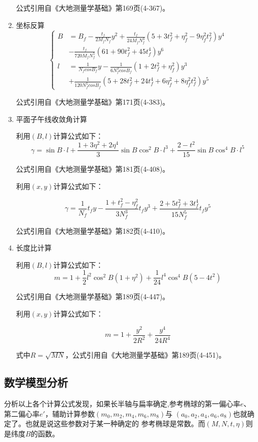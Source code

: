 \begin{enumerate}
公式引用自《大地测量学基础》第169页(4-367)。

\item 坐标反算
\[
\left \{ \begin{aligned}
B&=B_f - \frac{t_f}{2M_f N_f }y^2 +\frac{t_f}{24 M_f N_f ^3}
(5 + 3t_f ^2  + \eta_f ^2 - 9\eta_f ^2 t_f^2)y^4 \\
 &- \frac{t_f}{720 M_f N_f ^5}(61 + 90t_f ^2 + 45t_f ^4)y^6 \\
l&=\frac{1}{N_f cosB_f}y - \frac{1}{6N_f ^3 cosB_f}(1 + 2t_f ^2 + \eta_f ^2)y^3  \\
 &+ \frac{1}{120N_f ^5 cosB_f}(5 + 28t_f ^2 + 24t_f ^4 + 6\eta_f ^2 +8\eta_f ^2 t_f ^2)y^5
\end{aligned} \right.
\]

公式引用自《大地测量学基础》第171页(4-383)。


\item 平面子午线收敛角计算

利用$(B, l)$计算公式如下：
$$\gamma = \sin B \cdot l + \frac{1 + 3 \eta^2 + 2 \eta^4}{3} \sin B \cos ^2 B \cdot l^3 
+ \frac{2 - t^2}{15}\sin B \cos ^4 B \cdot l^5$$

公式引用自《大地测量学基础》第181页(4-408)。

利用$(x, y)$计算公式如下：

$$\gamma = \frac{1}{N_f}t_f y - \frac{1+t_f ^2 - \eta_f ^2}{3N_f ^3}t_f y^3 
+ \frac{2+5t_f^2+3t_f^4}{15N_f ^5}t_fy^5$$

公式引用自《大地测量学基础》第182页(4-410)。

\item 长度比计算

利用$(B, l)$计算公式如下：
$$m=1+\frac{1}{2}l^2 \cos ^2 B(1+\eta^2) + \frac{1}{24}l^4\cos ^4 B(5-4t^2)$$

公式引用自《大地测量学基础》第189页(4-447)。

利用$(x, y)$计算公式如下：

$$m=1+\frac{y^2}{2R^2} + \frac{y^4}{24R^4}$$

式中$R=\sqrt{MN}$，公式引用自《大地测量学基础》第189页(4-451)。

\end{enumerate}

\subsection{数学模型分析}
分析以上各个计算公式发现，如果长半轴与扁率确定,参考椭球的第一偏心率$e$、
第二偏心率$e'$，辅助计算参数$(m_0, m_2, m_4, m_6, m_8)$与
$(a_0, a_2, a_4, a_6, a_8)$也就确定了。也就是说这些参数对于某一种确定的
参考椭球是常数。而$(M,N,t,\eta)$则是纬度$B$的函数。

